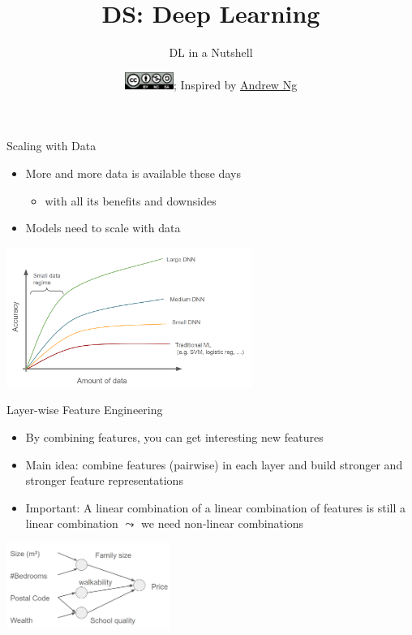 \documentclass[aspectratio=169]{../latex_main/tntbeamer}  %
\title[DL in a Nutshell]{DS: Deep Learning}
\subtitle{DL in a Nutshell}
\date{\hspace{0.5em} {\includegraphics[height=1.5em]{../latex_main/figures/Cc-by-nc-sa_icon.svg.png}}; Inspired by \href{https://www.deeplearning.ai/resources/}{Andrew Ng}}
\begin{document}
	
	\maketitle
	\begin{frame}{Scaling with Data}

        \begin{itemize}
            \item More and more data is available these days
            \begin{itemize}
                \item with all its benefits and downsides
            \end{itemize}
            \item Models need to scale with data
        \end{itemize}

        \centering
        \includegraphics[width=0.6\textwidth]{figures/dl_scaling}


	\end{frame}

 	\begin{frame}{Layer-wise Feature Engineering}

        \begin{itemize}
            \item By combining features, you can get interesting new features
            \item Main idea: combine features (pairwise) in each layer and build stronger and stronger feature representations
            \item Important: A linear combination of a linear combination of features is still a linear combination $\leadsto$ we need non-linear combinations
        \end{itemize}

        \centering
        \includegraphics[width=0.4\textwidth]{figures/layer_rep}

	\end{frame}
\end{document}
